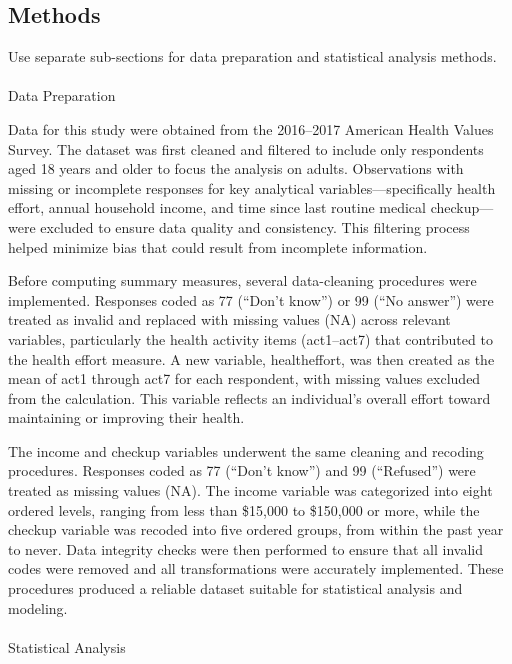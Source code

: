 \documentclass[
  letterpaper,
  DIV=11,
  numbers=noendperiod]{scrartcl}
\makeatletter
\let\oldparagraph\paragraph
\renewcommand{\paragraph}{
    \@ifstar
      \xxxParagraphStar
      \xxxParagraphNoStar
  }
\newcommand{\xxxParagraphStar}[1]{\oldparagraph*{#1}\mbox{}}
\newcommand{\xxxParagraphNoStar}[1]{\oldparagraph{#1}\mbox{}}
\makeatother
\begin{document}
\subsection{Methods}\label{methods}

Use separate sub-sections for data preparation and statistical analysis
methods.

\paragraph{Data Preparation}\label{sec-dataprep-methods}

Data for this study were obtained from the 2016--2017 American Health
Values Survey. The dataset was first cleaned and filtered to include
only respondents aged 18 years and older to focus the analysis on
adults. Observations with missing or incomplete responses for key
analytical variables---specifically health effort, annual household
income, and time since last routine medical checkup---were excluded to
ensure data quality and consistency. This filtering process helped
minimize bias that could result from incomplete information.

Before computing summary measures, several data-cleaning procedures were
implemented. Responses coded as 77 (``Don't know'') or 99 (``No
answer'') were treated as invalid and replaced with missing values (NA)
across relevant variables, particularly the health activity items
(act1--act7) that contributed to the health effort measure. A new
variable, healtheffort, was then created as the mean of act1 through
act7 for each respondent, with missing values excluded from the
calculation. This variable reflects an individual's overall effort
toward maintaining or improving their health.

The income and checkup variables underwent the same cleaning and
recoding procedures. Responses coded as 77 (``Don't know'') and 99
(``Refused'') were treated as missing values (NA). The income variable
was categorized into eight ordered levels, ranging from less than
\$15,000 to \$150,000 or more, while the checkup variable was recoded
into five ordered groups, from within the past year to never. Data
integrity checks were then performed to ensure that all invalid codes
were removed and all transformations were accurately implemented. These
procedures produced a reliable dataset suitable for statistical analysis
and modeling.

\paragraph{Statistical Analysis}\label{sec-analysis-methods}
\end{document}
